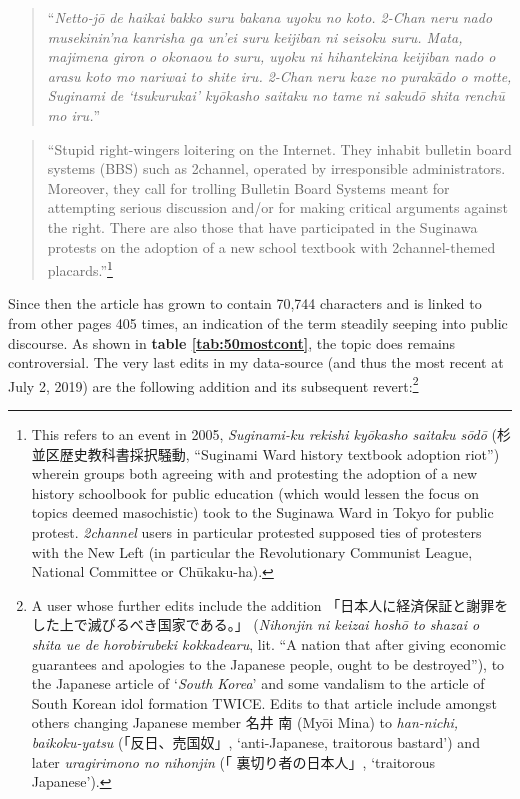 \documentclass[10pt,british,A4paper,,openany]{memoir}
\begin{document}
\begin{quote}
``\emph{Netto-jō de haikai bakko suru bakana uyoku no koto. 2-Chan neru
nado musekinin'na kanrisha ga un'ei suru keijiban ni seisoku suru. Mata,
majimena giron o okonaou to suru, uyoku ni hihantekina keijiban nado o
arasu koto mo nariwai to shite iru. 2-Chan neru kaze no purakādo o
motte, Suginami de `tsukurukai' kyōkasho saitaku no tame ni sakudō shita
renchū mo iru.}''
\end{quote}

\begin{quote}
``Stupid right-wingers loitering on the Internet. They inhabit bulletin
board systems (BBS) such as 2channel, operated by irresponsible
administrators. Moreover, they call for trolling Bulletin Board Systems
meant for attempting serious discussion and/or for making critical
arguments against the right. There are also those that have participated
in the Suginawa protests on the adoption of a new school textbook with
2channel-themed placards.''\footnote{This refers to an event in 2005,
  \emph{Suginami-ku rekishi kyōkasho saitaku sōdō}
  (杉並区歴史教科書採択騒動, ``Suginami Ward history textbook adoption
  riot'') wherein groups both agreeing with and protesting the adoption
  of a new history schoolbook for public education (which would lessen
  the focus on topics deemed masochistic) took to the Suginawa Ward in
  Tokyo for public protest. \emph{2channel} users in particular
  protested supposed ties of protesters with the New Left (in particular
  the Revolutionary Communist League, National Committee or Chūkaku-ha).}
\end{quote}

Since then the article has grown to contain 70,744 characters and is
linked to from other pages 405 times, an indication of the term steadily
seeping into public discourse. As shown in \textbf{table
\ref{tab:50mostcont}}, the topic does remains controversial. The very
last edits in my data-source (and thus the most recent at July 2, 2019)
are the following addition and its subsequent revert:\footnote{A user
  whose further edits include the addition
  「日本人に経済保証と謝罪をした上で滅びるべき国家である。」
  (\emph{Nihonjin ni keizai hoshō to shazai o shita ue de horobirubeki
  kokkadearu}, lit. ``A nation that after giving economic guarantees and
  apologies to the Japanese people, ought to be destroyed''), to the
  Japanese article of `\emph{South Korea}' and some vandalism to the
  article of South Korean idol formation TWICE. Edits to that article
  include amongst others changing Japanese member 名井 南 (Myōi Mina) to
  \emph{han-nichi, baikoku-yatsu} (「反日、売国奴」, `anti-Japanese,
  traitorous bastard') and later \emph{uragirimono no nihonjin} (「
  裏切り者の日本人」, `traitorous Japanese').}
\end{document}
